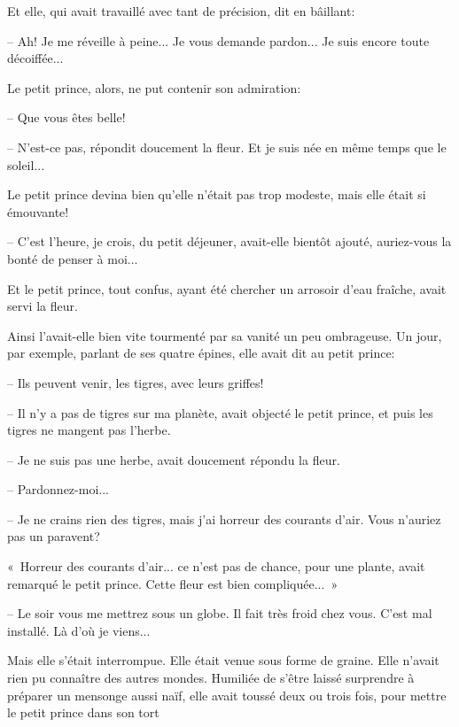 \documentclass[a4paper]{report}
\begin{document}
Et elle, qui avait travaillé avec tant de précision, dit en bâillant:

-- Ah! Je me réveille à peine... Je vous demande pardon... Je suis encore toute décoiffée...

Le petit prince, alors, ne put contenir son admiration:

-- Que vous êtes belle!

-- N'est-ce pas, répondit doucement la fleur. Et je suis née en même temps que le soleil...


Le petit prince devina bien qu'elle n'était pas trop modeste, mais elle était si émouvante!

-- C'est l'heure, je crois, du petit déjeuner, avait-elle bientôt ajouté, auriez-vous la bonté de penser à moi...


Et le petit prince, tout confus, ayant été chercher un arrosoir d'eau fraîche, avait servi la fleur.

Ainsi l'avait-elle bien vite tourmenté par sa vanité un peu ombrageuse. Un jour, par exemple, parlant de ses quatre épines, elle avait dit au petit prince:

-- Ils peuvent venir, les tigres, avec leurs griffes!

-- Il n'y a pas de tigres sur ma planète, avait objecté le petit prince, et puis les tigres ne mangent pas l'herbe. 


-- Je ne suis pas une herbe, avait doucement répondu la fleur.

-- Pardonnez-moi...

-- Je ne crains rien des tigres, mais j'ai horreur des courants d'air. Vous n'auriez pas un paravent?

«~Horreur des courants d'air... ce n'est pas de chance, pour une plante, avait remarqué le petit prince. Cette fleur est bien compliquée...~»

-- Le soir vous me mettrez sous un globe. Il fait très froid chez vous. C'est mal installé. Là d'où je viens...

Mais elle s'était interrompue. Elle était venue sous forme de graine. Elle n'avait rien pu connaître des autres mondes. Humiliée de s'être laissé surprendre à préparer un mensonge aussi naïf, elle avait toussé deux ou trois fois, pour mettre le petit prince dans son tort 

\end{document}
